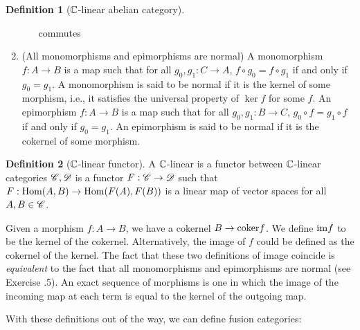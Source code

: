 \documentclass{article}
\theoremstyle{definition}
\newtheorem*{definition}{Definition}
\numberwithin{figure}{section}
\begin{document}
\begin{definition}[$\mathbb{C}$-linear abelian category]
\begin{enumerate}
\begin{itemize}
commutes
\end{itemize}
\item (All monomorphisms and epimorphisms are normal) A monomorphism $f:A\to B$ is a map such that for all $g_0,g_1: C\to A$, $f\circ g_0=f\circ g_1$ if and only if $g_0=g_1$. A monomorphism is said to be normal if it is the kernel of some morphism, i.e., it satisfies the universal property of $\ker f$ for some $f$. An epimorphism $f:A\to B$ is a map such that for all $g_0,g_1:B\to C$, $g_0\circ f=g_1\circ f$ if and only if $g_0=g_1$. An epimorphism is said to be normal if it is the cokernel of some morphism.
\end{enumerate}
\raggedleft\qedsymbol{}
\end{definition}

\begin{definition}[$\mathbb{C}$-linear functor] A $\mathbb{C}$-linear is a functor between $\mathbb{C}$-linear categories $\mathscr{C},\mathscr{D}$ is a functor $F:\mathscr{C}\to\mathscr{D}$ such that $F:\mathrm{Hom}(A,B)\to \mathrm{Hom}(F(A),F(B))$ is a linear map of vector spaces for all $A,B\in \mathscr{C}$.

\raggedleft\qedsymbol{}
\end{definition}

Given a morphism $f:A\to B$, we have a cokernel $B\to \mathrm{coker} f$. We define $\mathrm{im} f$ to be the kernel of the cokernel. Alternatively, the image of $f$ could be defined as the cokernel of the kernel. The fact that these two definitions of image coincide is \textit{equivalent} to the fact that all monomorphisms and epimorphisms are normal (see Exercise \thesection.5). An exact sequence of morphisms is one in which the image of the incoming map at each term is equal to the kernel of the outgoing map. 

With these definitions out of the way, we can define fusion categories:
\end{document}
